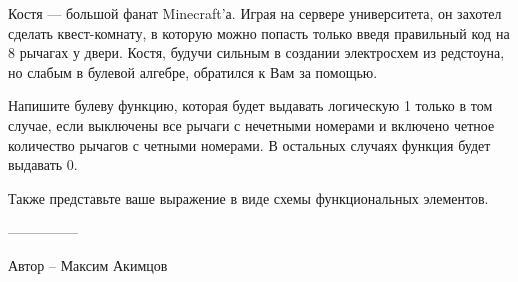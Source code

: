 \question
Костя — большой фанат Minecraft’а. Играя на сервере университета, он захотел сделать квест-комнату, в которую можно попасть только введя правильный код на 8 рычагах у двери. Костя, будучи сильным в создании электросхем из редстоуна, но слабым в булевой алгебре, обратился к Вам за помощью. 

Напишите булеву функцию, которая будет выдавать логическую 1 только в том случае, если выключены все рычаги с нечетными номерами и включено четное количество рычагов с четными номерами. В остальных случаях функция будет выдавать 0. 

Также представьте ваше выражение в виде схемы функциональных элементов.

---------------

Автор -- Максим Акимцов